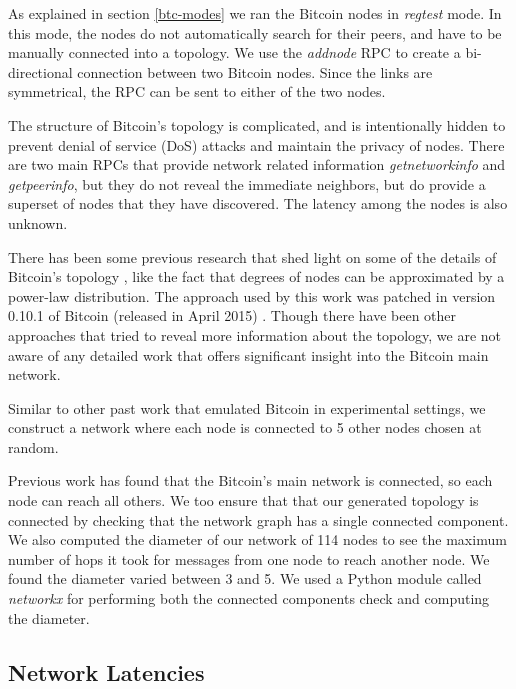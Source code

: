 As explained in section \ref{btc-modes} we ran the Bitcoin nodes in \textit{regtest} mode. In this mode, the nodes do not automatically search for their peers, and have to be manually connected into a topology. We use the \textit{addnode} RPC to create a bi-directional connection between two Bitcoin nodes. Since the links are symmetrical, the RPC can be sent to either of the two nodes. 

The structure of Bitcoin's topology is complicated, and is intentionally hidden to prevent denial of service (DoS) attacks and maintain the privacy of nodes. 
There are two main RPCs that provide network related information \textit{getnetworkinfo} and \textit{getpeerinfo}, but they do not reveal the immediate neighbors, but do provide a superset of nodes that they have discovered. 
The latency among the nodes is also unknown. 

There has been some previous research that shed light on some of the details of Bitcoin's topology \cite{coinscope}, like the fact that degrees of nodes can be approximated by a power-law distribution. The approach used by this work was patched in version 0.10.1 of Bitcoin (released in April 2015) \cite{bitcoinTxnBugFix}.
Though there have been other approaches \cite{bitcoinTopology2018} that tried to reveal more information about the topology, we are not aware of any detailed work that offers significant insight into the Bitcoin main network.

Similar to other past work \cite{bitcoinNG} that emulated Bitcoin in experimental settings, we construct a network where each node is connected to 5 other nodes chosen at random.

Previous work \cite{btcmap} has found that the Bitcoin's main network is connected, so each node can reach all others. 
We too ensure that that our generated topology is connected by checking that the network graph has a single connected component.
We also computed the diameter of our network of 114 nodes to see the maximum number of hops it took for messages from one node to reach another node. We found the diameter varied between 3 and 5.
We used a Python module called \textit{networkx} \cite{networkX} for performing both the connected components check and computing the diameter. 

\subsection{Network Latencies} \label{exp-setup-latencies}

